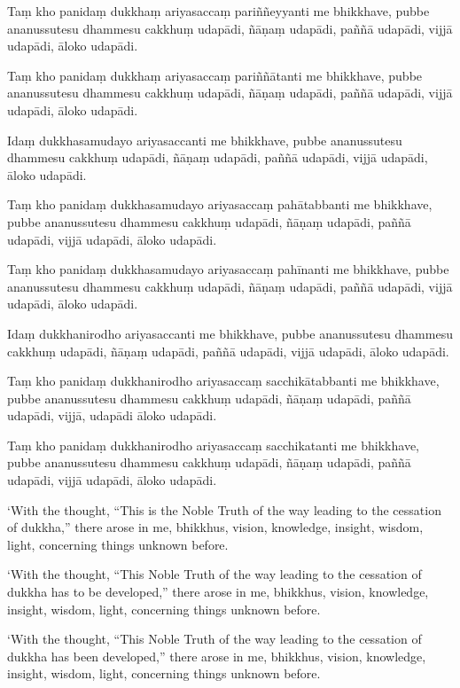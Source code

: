 \clearpage

\paliText
\markboth{\paliTitle}{\rightmark}

Taṃ kho panidaṃ dukkhaṃ ariyasaccaṃ pariññeyyanti me bhikkhave, pubbe
ananussutesu dhammesu cakkhuṃ udapādi, ñāṇaṃ udapādi, paññā udapādi,
vijjā udapādi, āloko udapādi.

Taṃ kho panidaṃ dukkhaṃ ariyasaccaṃ pariññātanti me bhikkhave, pubbe
ananussutesu dhammesu cakkhuṃ udapādi, ñāṇaṃ udapādi, paññā udapādi,
vijjā udapādi, āloko udapādi.

Idaṃ dukkhasamudayo ariyasaccanti me bhikkhave, pubbe ananussutesu
dhammesu cakkhuṃ udapādi, ñāṇaṃ udapādi, paññā udapādi, vijjā udapādi,
āloko udapādi.

Taṃ kho panidaṃ dukkhasamudayo ariyasaccaṃ pahātabbanti me bhikkhave,
pubbe ananussutesu dhammesu cakkhuṃ udapādi, ñāṇaṃ udapādi, paññā
udapādi, vijjā udapādi, āloko udapādi.

Taṃ kho panidaṃ dukkhasamudayo ariyasaccaṃ pahīnanti me bhikkhave, pubbe
ananussutesu dhammesu cakkhuṃ udapādi, ñāṇaṃ udapādi, paññā udapādi,
vijjā udapādi, āloko udapādi.

Idaṃ dukkhanirodho ariyasaccanti me bhikkhave, pubbe ananussutesu
dhammesu cakkhuṃ udapādi, ñāṇaṃ udapādi, paññā udapādi, vijjā udapādi,
āloko udapādi.

Taṃ kho panidaṃ dukkhanirodho ariyasaccaṃ sacchikātabbanti me bhikkhave,
pubbe ananussutesu dhammesu cakkhuṃ udapādi, ñāṇaṃ udapādi, paññā
udapādi, vijjā, udapādi āloko udapādi.

Taṃ kho panidaṃ dukkhanirodho ariyasaccaṃ sacchikatanti me bhikkhave,
pubbe ananussutesu dhammesu cakkhuṃ udapādi, ñāṇaṃ udapādi, paññā
udapādi, vijjā udapādi, āloko udapādi.

\clearpage

\englishText
\markboth{\englishTitle}{\rightmark}

‘With the thought, “This is the Noble Truth of the way leading to the
cessation of dukkha,” there arose in me, bhikkhus, vision, knowledge,
insight, wisdom, light, concerning things unknown before.

‘With the thought, “This Noble Truth of the way leading to the cessation
of dukkha has to be developed,” there arose in me, bhikkhus, vision,
knowledge, insight, wisdom, light, concerning things unknown before.

‘With the thought, “This Noble Truth of the way leading to the cessation
of dukkha has been developed,” there arose in me, bhikkhus, vision,
knowledge, insight, wisdom, light, concerning things unknown before.


